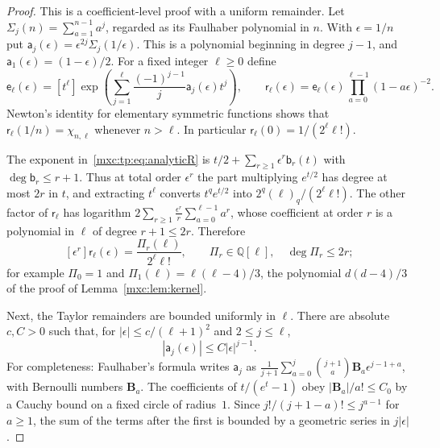 \documentclass[11pt]{article}
\numberwithin{equation}{section}
\theoremstyle{definition}
\theoremstyle{remark}
\begin{document}
\begin{proof}
This is a coefficient-level proof with a uniform remainder. Let
$\Sigma_j(n)=\sum_{a=1}^{n-1}a^j$, regarded as its Faulhaber polynomial in
$n$. With $\epsilon=1/n$ put $\mathsf a_j(\epsilon)=\epsilon^{2j}\Sigma_j(1/\epsilon)$.
This is a polynomial beginning in degree $j-1$, and
$\mathsf a_1(\epsilon)=(1-\epsilon)/2$. For a fixed integer $\ell\ge0$
define
\begin{equation}\label{mxc:tp:eq:analyticR}
 \mathsf e_\ell(\epsilon)=[t^\ell]\exp\left(
 \sum_{j=1}^{\ell}\frac{(-1)^{j-1}}{j}\mathsf a_j(\epsilon)t^j\right),
 \qquad
 \mathsf r_\ell(\epsilon)=\mathsf e_\ell(\epsilon)
 \prod_{a=0}^{\ell-1}(1-a\epsilon)^{-2}.
\end{equation}
Newton's identity for elementary symmetric functions shows that
$\mathsf r_\ell(1/n)=\chi_{n,\ell}$ whenever $n>\ell$. In particular
$\mathsf r_\ell(0)=1/(2^\ell\ell!)$.

The exponent in~\eqref{mxc:tp:eq:analyticR} is
$t/2+\sum_{r\ge1}\epsilon^r\mathsf b_r(t)$ with $\deg\mathsf b_r\le r+1$.
Thus at total order $\epsilon^r$ the part multiplying $e^{t/2}$ has
degree at most $2r$ in $t$, and extracting $t^\ell$ converts
$t^qe^{t/2}$ into $2^q(\ell)_q/(2^\ell\ell!)$. The other factor of
$\mathsf r_\ell$ has logarithm
$2\sum_{r\ge1}\frac{\epsilon^r}{r}\sum_{a=0}^{\ell-1}a^r$, whose
coefficient at order $r$ is a polynomial in $\ell$ of degree
$r+1\le2r$. Therefore
\begin{equation}\label{mxc:tp:eq:Pr}
 [\epsilon^r]\mathsf r_\ell(\epsilon)=\frac{\Pi_r(\ell)}{2^\ell\ell!},
 \qquad \Pi_r\in\mathbb Q[\ell],\quad\deg\Pi_r\le2r;
\end{equation}
for example $\Pi_0=1$ and $\Pi_1(\ell)=\ell(\ell-4)/3$, the polynomial
$d(d-4)/3$ of the proof of Lemma~\ref{mxc:lem:kernel}.

Next, the Taylor remainders are bounded uniformly in $\ell$. There are
absolute $c,C>0$ such that, for $|\epsilon|\le c/(\ell+1)^2$ and
$2\le j\le\ell$,
\begin{equation}\label{mxc:tp:eq:faulbound}
 |\mathsf a_j(\epsilon)|\le C|\epsilon|^{j-1}.
\end{equation}
For completeness: Faulhaber's formula writes $\mathsf a_j$ as
$\frac1{j+1}\sum_{a=0}^j\binom{j+1}{a}\mathbf B_a\epsilon^{j-1+a}$, with
Bernoulli numbers $\mathbf B_a$. The coefficients of $t/(e^t-1)$ obey
$|\mathbf B_a|/a!\le C_0$ by a Cauchy bound on a fixed circle of
radius~$1$. Since $j!/(j+1-a)!\le j^{a-1}$ for $a\ge1$, the sum of the
terms after the first is bounded by a geometric series in $j|\epsilon|$.


\end{proof}
\end{document}
